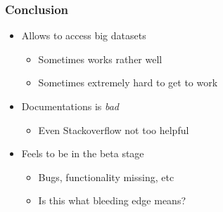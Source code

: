 \documentclass[mathserif, xcolor=table, svgnames]{beamer}
\begin{document}
\begin{frame}
  \frametitle{Conclusion}
  \begin{itemize}
  \item Allows to access big datasets
    \begin{itemize}
    \item Sometimes works rather well
    \item Sometimes extremely hard to get to work
    \end{itemize}
  \item Documentations is \emph{bad}
    \begin{itemize}
    \item Even Stackoverflow not too helpful
    \end{itemize}
  \item Feels to be in the beta stage
    \begin{itemize}
    \item Bugs, functionality missing, etc
    \item Is this what bleeding edge means?
    \end{itemize}
  \end{itemize}
\end{frame}
\end{document}
